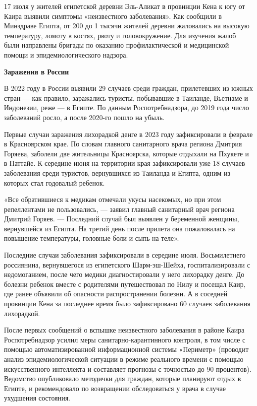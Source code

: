 17 июля у жителей египетской деревни Эль-Аликат в провинции Кена к югу от Каира выявили симптомы «неизвестного заболевания». Как сообщили в Минздраве Египта, от 200 до 1 тысячи жителей деревни жаловались на высокую температуру, ломоту в костях, рвоту и головокружение. Для изучения жалоб были направлены бригады по оказанию профилактической и медицинской помощи и эпидемиологического надзора.

\textbf{Заражения в России}

В 2022 году в России выявили 29 случаев среди граждан, прилетевших из южных стран — как правило, заражались туристы, побывавшие в Таиланде, Вьетнаме и Индонезии, реже — в Египте. По данным Роспотребнадзора, до 2019 года число заболеваний росло, а после 2020-го пошло на убыль.

Первые случаи заражения лихорадкой денге в 2023 году зафиксировали в феврале в Красноярском крае. По словам главного санитарного врача региона Дмитрия Горяева, заболели две жительницы Красноярска, которые отдыхали на Пхукете и в Паттайе. К середине июня на территории края зафиксировали уже 18 случаев заболевания среди туристов, вернувшихся из Таиланда и Египта, одним из которых стал годовалый ребенок.

«Все обратившиеся к медикам отмечали укусы насекомых, но при этом репеллентами не пользовались, — заявил главный санитарный врач региона Дмитрий Горяев. — Последний случай был выявлен у беременной женщины, вернувшейся из Египта. На третий день после прилета она пожаловалась на повышение температуры, головные боли и сыпь на теле».

Последние случаи заболевания зафиксировали в середине июля. Восьмилетнего россиянина, вернувшегося из египетского Шарм-эш-Шейха, госпитализировали с недомоганием, после чего медики диагностировали у него лихорадку денге. До болезни ребенок вместе с родителями путешествовал по Нилу и посещал Каир, где ранее объявили об опасности распространении болезни. А в соседней провинции Кена за последнее время было зафиксировано 60 случаев заболевания лихорадкой.

После первых сообщений о вспышке неизвестного заболевания в районе Каира Роспотребнадзор усилил меры санитарно-карантинного контроля, в том числе с помощью автоматизированной информационной системы «Периметр» (проводит анализ эпидемиологической ситуации в режиме реального времени с помощью искусственного интеллекта и составляет прогнозы с точностью до 90 процентов). Ведомство опубликовало методички для граждан, которые планируют отдых в Египте, и рекомендовало по возвращении обследоваться у врача в случае ухудшения состояния.

